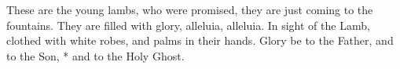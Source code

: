 These are the young lambs, who were promised, they are just coming to the fountains.
\versseparator
They are filled with glory, alleluia, alleluia.
\versseparator
In sight of the Lamb, clothed with white robes, and palms in their hands.
\versseparator
Glory be to the Father, and to the Son, * and to the Holy Ghost.
